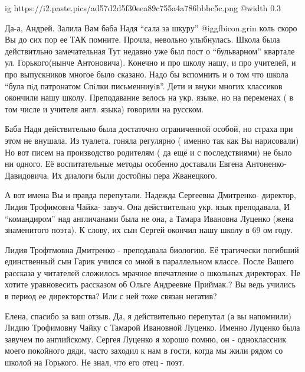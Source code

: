 \begin{itemize}
\begin{itemize}
\end{itemize} %


\ifcmt
  ig https://i2.paste.pics/ad57d2d5f30eea89c755a4a786bbbc5c.png
  @width 0.3
\fi


Да-а, Андрей. Залила Вам баба Надя \enquote{сала за шкуру} @igg{fbicon.grin}  коль скоро Вы до
сих пор ее ТАК помните. Прочла, невольно улыбнулась. Школа была действитльно
замечательная Тут недавно уже был пост о \enquote{бульварном} квартале ул.
Горького(нынче Антоновича).  Конечно и про школу нашу, и про учителей, и про
выпускников многое было сказано. Надо бы вспомнить и о том что школа
\enquote{була пiд патронатом Спiлки письменниуiв}. Дети и внуки многих
классиков окончили нашу школу. Преподавание велось на укр. языке, но на
переменах ( в том числе и учителя англ. языка) говорили на русском. 

Баба Надя действительно была достаточно ограниченной особой, но страха при этом
не внушала. Из туалета. гоняла регулярно ( именно так как Вы нарисовали) Но вот
писем на производство родителям ( да ещё и с последствиями) не было ни одного.
Её воспитательные методы особенно доставали Евгена Антоненко-Давидовича. Их
диалоги были достойны пера Жванецкого. 

А вот имена Вы и правда перепутали. Надежда Сергеевна Дмитренко- директор,
Лидия Трофимовна Чайка- завуч. Она действительно укр. язык преподавала, И
\enquote{командиром} над англичанами была не она, а Тамара Ивановна Луценко
(жена знаменитого поэта). К слову, их сын Сергей окончил нашу школу в 69 ом
году. 

Лидия Трофтмовна Дмитренко - преподавала биологию. Её трагически погибший
единственный сын Гарик учился со мной в параллельном классе. После Вашего
рассказа у читателей сложилось мрачное впечатление о школьных директорах. Не
хотите уравновесить рассказом об Ольге Андреевне Приймак.? Вы ведь учились в
период ее директорства? Или с ней тоже связан негатив?

\begin{itemize} %

Елена, спасибо за ваш отзыв. Да, я действительно перепутал (а вы напомнили)
Лидию Трофимовну Чайку с Тамарой Ивановной Луценко. Именно Луценко была завучем
по английскому. Сергея Луценко я хорошо помню, он - одноклассник моего
покойного дяди, часто заходил к нам в гости, когда мы жили рядом со школой на
Горького. Не знал, что его отец - поэт. 


\end{itemize}
\end{itemize}
